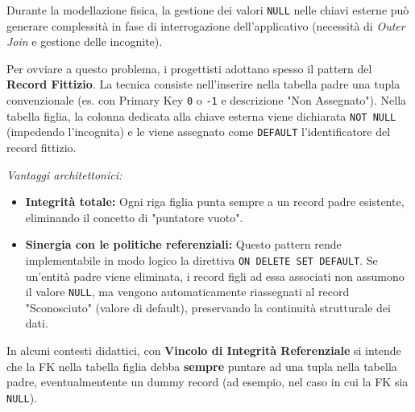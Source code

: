 \begin{bestpractice}
Durante la modellazione fisica, la gestione dei valori \texttt{NULL} nelle chiavi esterne può generare complessità in fase di interrogazione dell'applicativo (necessità di \textit{Outer Join} e gestione delle incognite). 

Per ovviare a questo problema, i progettisti adottano spesso il pattern del \textbf{Record Fittizio}. La tecnica consiste nell'inserire nella tabella padre una tupla convenzionale (es. con Primary Key \texttt{0} o \texttt{-1} e descrizione "Non Assegnato"). 
Nella tabella figlia, la colonna dedicata alla chiave esterna viene dichiarata \texttt{NOT NULL} (impedendo l'incognita) e le viene assegnato come \texttt{DEFAULT} l'identificatore del record fittizio.

\textit{Vantaggi architettonici:}
\begin{itemize}
    \item \textbf{Integrità totale:} Ogni riga figlia punta sempre a un record padre esistente, eliminando il concetto di "puntatore vuoto".
    \item \textbf{Sinergia con le politiche referenziali:} Questo pattern rende implementabile in modo logico la direttiva \texttt{ON DELETE SET DEFAULT}. Se un'entità padre viene eliminata, i record figli ad essa associati non assumono il valore \texttt{NULL}, ma vengono automaticamente riassegnati al record "Sconosciuto" (valore di default), preservando la continuità strutturale dei dati.
\end{itemize}
\end{bestpractice}

\begin{warningbox}[]
    In alcuni contesti didattici, con \textbf{Vincolo di Integrità Referenziale} si intende che la FK nella tabella figlia debba \textbf{sempre} puntare ad una tupla nella tabella padre, eventualmentente un dummy record (ad esempio, nel caso in cui la FK sia \texttt{NULL}). 
\end{warningbox}









